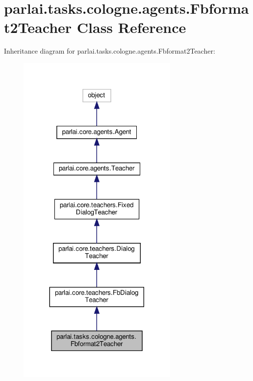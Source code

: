 \hypertarget{classparlai_1_1tasks_1_1cologne_1_1agents_1_1Fbformat2Teacher}{}\section{parlai.\+tasks.\+cologne.\+agents.\+Fbformat2\+Teacher Class Reference}
\label{classparlai_1_1tasks_1_1cologne_1_1agents_1_1Fbformat2Teacher}


Inheritance diagram for parlai.\+tasks.\+cologne.\+agents.\+Fbformat2\+Teacher\+:
\nopagebreak
\begin{figure}[H]
\begin{center}
\leavevmode
\includegraphics[width=224pt]{de/d5a/classparlai_1_1tasks_1_1cologne_1_1agents_1_1Fbformat2Teacher__inherit__graph}
\end{center}
\end{figure}


